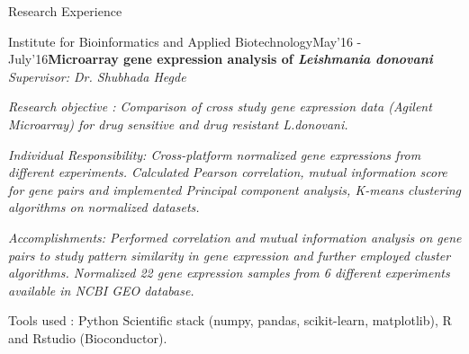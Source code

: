 \documentclass{resume} %
\begin{document}
\begin{rSection}{Research Experience}

\begin{rSubsection}{Institute for Bioinformatics and Applied Biotechnology}{May'16 - July'16}{\textbf{Microarray gene expression analysis of \textit{Leishmania donovani}
} \\
 \emph{\it Supervisor: Dr. Shubhada Hegde} \\[-0.6cm]}{}
	\item \it {Research objective} : Comparison of cross study gene expression data (Agilent Microarray) for drug sensitive and drug resistant \textit{L.donovani}.
    \item \it {Individual Responsibility}: Cross-platform normalized gene expressions from different experiments. Calculated Pearson correlation, mutual information score for gene pairs and implemented Principal component analysis, K-means clustering algorithms on normalized datasets.	
	\item \it {Accomplishments:} Performed correlation and mutual information analysis on gene pairs to study pattern similarity in gene expression and further employed cluster algorithms. Normalized 22 gene expression samples from 6 different experiments available in NCBI GEO database.
	\item Tools used : Python Scientific stack (numpy, pandas, scikit-learn, matplotlib), R and Rstudio (Bioconductor).
\end{rSubsection}


\end{rSection}
\end{document}
